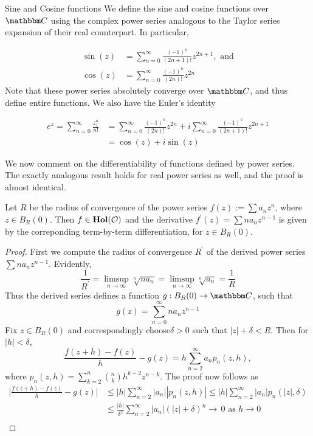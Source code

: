 \documentclass[../ComplexAnalysis_Notes.tex]{subfiles}
\begin{document}
\begin{Eg}{Sine and Cosine functions}{}
We define the sine and cosine functions over $\C$ using the complex power series analogous to the Taylor series expansion of their real counterpart. In particular,

\begin{align*}
\sin(z) &= \sum_{n=0}^\infty \frac{(-1)^n}{(2n+1)!}z^{2n+1}, \text{ and}\\
\cos(z) &= \sum_{n=0}^\infty \frac{(-1)^n}{(2n)!}z^{2n}
\end{align*}
Note that these power series absolutely converge over $\C$, and thus define entire functions. We also have the Euler's identity

\begin{align*}
e^z = \sum_{n=0}^{\infty} \frac{z_1^n}{n!} &= \sum_{n=0}^\infty \frac{(-1)^n}{(2n)!}z^{2n} + i\sum_{n=0}^\infty \frac{(-1)^n}{(2n+1)!}z^{2n+1}\\
&= \cos(z) + i\sin(z)
\end{align*}

\end{Eg}

We now comment on the differentiability of functions defined by power series. The exactly analogous result holds for real power series as well, and the proof is almost identical.

\begin{Thm}{}{}

Let $R$ be the radius of convergence of the power series $f(z) := \sum a_n z^n$, where $z \in B_R(0)$. Then $f \in \operatorname{\mathbf{Hol}}(\mathcal{O})$ and the derivative $f^\prime(z) = \sum na_n z^{n-1}$ is given by the correponding term-by-term differentiation, for $z \in B_R(0)$.

\end{Thm}

\begin{proof}
First we compute the radius of convergence $R^\prime$ of the derived power series \(\sum na_n z^{n-1}\). Evidently,
\[\frac{1}{R^\prime} = \limsup_{n \to \infty} \sqrt[n]{na_n} = \limsup_{n \to \infty} \sqrt[n]{a_n} = \frac{1}{R}\]
Thus the derived series defines a function $g: B_R(0) \to \C$, such that
\[g(z) = \sum_{n=0}^\infty na_n z^{n-1}\]
Fix $z \in B_R(0)$ and correspondingly choose$\delta > 0$ such that $|z|+\delta < R$. Then for $|h| < \delta$,
\[\frac{f(z+h) - f(z)}{h} - g(z) = h \sum_{n=2}^\infty a_n p_n(z,h),\]
where $p_n(z,h) = \sum_{k=2}^n \binom{n}{k}h^{k-2}z^{n-k}$. The proof now follows as
\begin{align*}
\Bigg\rvert\frac{f(z+h) - f(z)}{h} - g(z)\Bigg\rvert &\leq |h| \sum_{n=2}^\infty |a_n| |p_n(z,h)|
\leq |h| \sum_{n=2}^\infty |a_n| p_n(|z|,\delta)\\
&\leq \frac{|h|}{\delta^2} \sum_{n=2}^\infty |a_n|(|z|+\delta)^n {\longrightarrow}\,0 \text{ as } h \to 0\\
\end{align*}
\end{proof}
\end{document}

